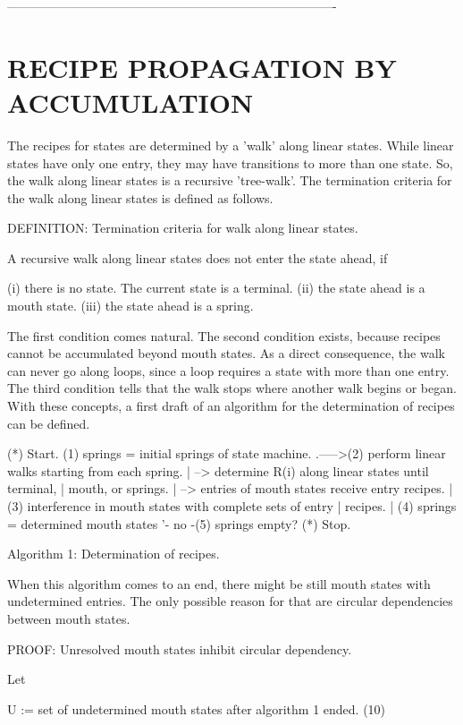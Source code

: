 \documentclass[12pt]{article}
\begin{document}
-------------------------------------------------------------------------------

\section{RECIPE PROPAGATION BY ACCUMULATION}

The recipes for states are determined by a 'walk' along linear states. While
linear states have only one entry, they may have transitions to more than one
state. So, the walk along linear states is a recursive 'tree-walk'. The
termination criteria for the walk along linear states is defined as follows.

DEFINITION: Termination criteria for walk along linear states.

    A recursive walk along linear states does not enter the
    state ahead, if 

       (i)   there is no state. The current state is a terminal.
       (ii)  the state ahead is a mouth state.
       (iii) the state ahead is a spring.

The first condition comes natural. The second condition exists, because recipes
cannot be accumulated beyond mouth states. As a direct consequence, the walk
can never go along loops, since a loop requires a state with more than one
entry. The third condition tells that the walk stops where another walk begins
or began.  With these concepts, a first draft of an algorithm for the
determination of recipes can be defined.

          (*) Start.
          (1) springs = initial springs of state machine.
   .----->(2) perform linear walks starting from each spring.
   |          --> determine R(i) along linear states until terminal,
   |              mouth, or springs.
   |          --> entries of mouth states receive entry recipes.
   |      (3) interference in mouth states with complete sets of entry
   |          recipes.
   |      (4) springs = determined mouth states
   '- no -(5) springs empty?
          (*) Stop.

        Algorithm 1: Determination of recipes.

When this algorithm comes to an end, there might be still mouth states with
undetermined entries. The only possible reason for that are circular
dependencies between mouth states. 

PROOF: Unresolved mouth states inhibit circular dependency.

Let 

        U := set of undetermined mouth states after algorithm 1 ended.       (10)
\end{document}
